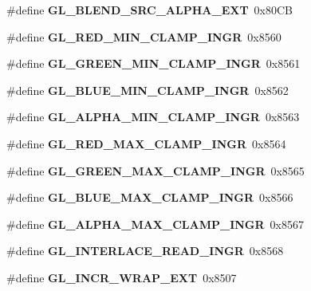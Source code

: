\begin{DoxyCompactItemize}
\item 
\#define {\bfseries G\+L\+\_\+\+B\+L\+E\+N\+D\+\_\+\+S\+R\+C\+\_\+\+A\+L\+P\+H\+A\+\_\+\+E\+X\+T}~0x80\+C\+B\label{_s_d_l__opengl_8h_a77fadfeb10316263647b8e8b5096e33c}

\item 
\#define {\bfseries G\+L\+\_\+\+R\+E\+D\+\_\+\+M\+I\+N\+\_\+\+C\+L\+A\+M\+P\+\_\+\+I\+N\+G\+R}~0x8560\label{_s_d_l__opengl_8h_ac4cd2410f93ac9e837920b4440f9bc3c}

\item 
\#define {\bfseries G\+L\+\_\+\+G\+R\+E\+E\+N\+\_\+\+M\+I\+N\+\_\+\+C\+L\+A\+M\+P\+\_\+\+I\+N\+G\+R}~0x8561\label{_s_d_l__opengl_8h_a68a59562119c15e21d61acbd14c60691}

\item 
\#define {\bfseries G\+L\+\_\+\+B\+L\+U\+E\+\_\+\+M\+I\+N\+\_\+\+C\+L\+A\+M\+P\+\_\+\+I\+N\+G\+R}~0x8562\label{_s_d_l__opengl_8h_a70c20879b4b67d9ae86af075ff80ea2a}

\item 
\#define {\bfseries G\+L\+\_\+\+A\+L\+P\+H\+A\+\_\+\+M\+I\+N\+\_\+\+C\+L\+A\+M\+P\+\_\+\+I\+N\+G\+R}~0x8563\label{_s_d_l__opengl_8h_a35b4a245afb02e60a0fc21eb8643a0e2}

\item 
\#define {\bfseries G\+L\+\_\+\+R\+E\+D\+\_\+\+M\+A\+X\+\_\+\+C\+L\+A\+M\+P\+\_\+\+I\+N\+G\+R}~0x8564\label{_s_d_l__opengl_8h_a91e132d1883db1deac9658a8a88090bc}

\item 
\#define {\bfseries G\+L\+\_\+\+G\+R\+E\+E\+N\+\_\+\+M\+A\+X\+\_\+\+C\+L\+A\+M\+P\+\_\+\+I\+N\+G\+R}~0x8565\label{_s_d_l__opengl_8h_a3f1547a5959faba8eb8673aa5afdaf3a}

\item 
\#define {\bfseries G\+L\+\_\+\+B\+L\+U\+E\+\_\+\+M\+A\+X\+\_\+\+C\+L\+A\+M\+P\+\_\+\+I\+N\+G\+R}~0x8566\label{_s_d_l__opengl_8h_a9fe90b7f4cc72d2db2ce66abd6bfd875}

\item 
\#define {\bfseries G\+L\+\_\+\+A\+L\+P\+H\+A\+\_\+\+M\+A\+X\+\_\+\+C\+L\+A\+M\+P\+\_\+\+I\+N\+G\+R}~0x8567\label{_s_d_l__opengl_8h_a6dde469b1fecde15622a52bef0f86137}

\item 
\#define {\bfseries G\+L\+\_\+\+I\+N\+T\+E\+R\+L\+A\+C\+E\+\_\+\+R\+E\+A\+D\+\_\+\+I\+N\+G\+R}~0x8568\label{_s_d_l__opengl_8h_a5d564df66c87dbc2d9521af7e053058e}

\item 
\#define {\bfseries G\+L\+\_\+\+I\+N\+C\+R\+\_\+\+W\+R\+A\+P\+\_\+\+E\+X\+T}~0x8507\label{_s_d_l__opengl_8h_a5704af45db2b9c64a8ca3e9c983f6471}


\end{DoxyCompactItemize}
